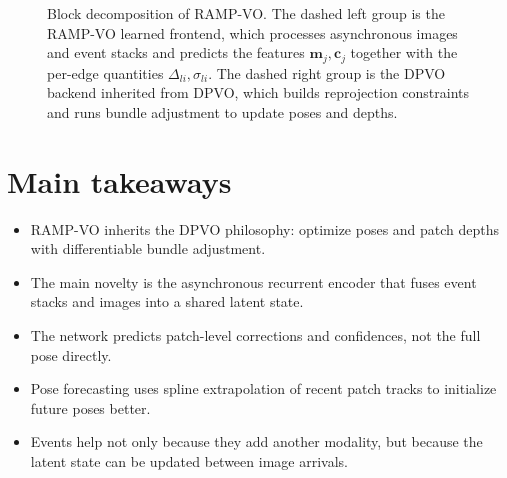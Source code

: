 \documentclass[11pt]{article}
\begin{document}
\begin{figure}[h!]
\caption{Block decomposition of RAMP-VO. The dashed left group is the RAMP-VO learned frontend, which processes asynchronous images and event stacks and predicts the features \(\mathbf{m}_j,\mathbf{c}_j\) together with the per-edge quantities \(\Delta_{li},\sigma_{li}\). The dashed right group is the DPVO backend inherited from DPVO, which builds reprojection constraints and runs bundle adjustment to update poses and depths.}
\end{figure}

\section{Main takeaways}

\begin{itemize}
    \item RAMP-VO inherits the DPVO philosophy: optimize poses and patch depths with differentiable bundle adjustment.
    \item The main novelty is the asynchronous recurrent encoder that fuses event stacks and images into a shared latent state.
    \item The network predicts patch-level corrections and confidences, not the full pose directly.
    \item Pose forecasting uses spline extrapolation of recent patch tracks to initialize future poses better.
    \item Events help not only because they add another modality, but because the latent state can be updated between image arrivals.
\end{itemize}
\end{document}
